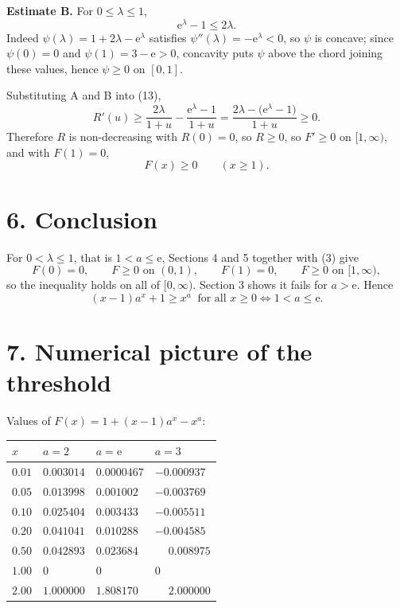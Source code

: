 \documentclass[12pt]{article}
\newcommand{\e}{\mathrm{e}}
\newcommand{\LL}{\lambda}
\begin{document}
\textbf{Estimate B.} For \(0\le\LL\le1\),
\[
\e^{\LL}-1\le2\LL .
\]
Indeed \(\psi(\LL)=1+2\LL-\e^{\LL}\) satisfies
\(\psi''(\LL)=-\e^{\LL}<0\), so \(\psi\) is concave; since
\(\psi(0)=0\) and \(\psi(1)=3-\e>0\), concavity puts \(\psi\) above the
chord joining these values, hence \(\psi\ge0\) on \([0,1]\).

Substituting A and B into (13),
\[
R'(u)\ge\frac{2\LL}{1+u}-\frac{\e^{\LL}-1}{1+u}
=\frac{2\LL-\bigl(\e^{\LL}-1\bigr)}{1+u}\ge0 .
\]
Therefore \(R\) is non-decreasing with \(R(0)=0\), so \(R\ge0\),
so \(F'\ge0\) on \([1,\infty)\), and with \(F(1)=0\),
\[
\boxed{F(x)\ge0\qquad(x\ge1).}
\]

\section*{6. Conclusion}

For \(0<\LL\le1\), that is \(1<a\le\e\), Sections 4 and 5 together with
(3) give
\[
F(0)=0,\qquad F\ge0\text{ on }(0,1),\qquad F(1)=0,\qquad F\ge0\text{ on }[1,\infty),
\]
so the inequality holds on all of \([0,\infty)\). Section 3 shows it
fails for \(a>\e\). Hence
\[
\boxed{\displaystyle
(x-1)a^x+1\ge x^a\ \text{ for all }x\ge0
\iff
1<a\le\e .}
\]

\section*{7. Numerical picture of the threshold}

Values of \(F(x)=1+(x-1)a^x-x^a\):

\begin{center}
\small
\renewcommand{\arraystretch}{1.3}
\begin{tabularx}{0.86\textwidth}{@{}lXXX@{}}
\toprule
\(x\) & \(a=2\) & \(a=\e\) & \(a=3\) \\
\midrule
\(0.01\) & \(0.003014\)  & \(0.0000467\) & \(-0.000937\) \\
\(0.05\) & \(0.013998\)  & \(0.001002\)  & \(-0.003769\) \\
\(0.10\) & \(0.025404\)  & \(0.003433\)  & \(-0.005511\) \\
\(0.20\) & \(0.041041\)  & \(0.010288\)  & \(-0.004585\) \\
\(0.50\) & \(0.042893\)  & \(0.023684\)  & \(\phantom{-}0.008975\) \\
\(1.00\) & \(0\)         & \(0\)         & \(0\) \\
\(2.00\) & \(1.000000\)  & \(1.808170\)  & \(\phantom{-}2.000000\) \\
\bottomrule
\end{tabularx}
\end{center}
\end{document}
